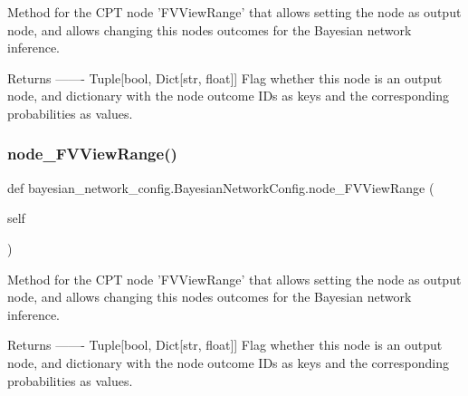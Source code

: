 \begin{DoxyVerb}Method for the CPT node 'FVViewRange' that allows setting the node as output node,
and allows changing this nodes outcomes for the Bayesian network inference.

Returns
-------
Tuple[bool, Dict[str, float]]
    Flag whether this node is an output node, and dictionary with the node outcome IDs as keys
    and the corresponding probabilities as values.
\end{DoxyVerb}
 \mbox{\label{classbayesian__network__config_1_1_bayesian_network_config_a14bac441795a8f3c96df9342dff6ecc2}} 
\subsubsection{\texorpdfstring{node\+\_\+\+F\+V\+View\+Range()}{node\_FVViewRange()}\hspace{0.1cm}{\footnotesize\ttfamily [2/3]}}
{\footnotesize\ttfamily def bayesian\+\_\+network\+\_\+config.\+Bayesian\+Network\+Config.\+node\+\_\+\+F\+V\+View\+Range (\begin{DoxyParamCaption}\item[{}]{self }\end{DoxyParamCaption})}

\begin{DoxyVerb}Method for the CPT node 'FVViewRange' that allows setting the node as output node,
and allows changing this nodes outcomes for the Bayesian network inference.

Returns
-------
Tuple[bool, Dict[str, float]]
    Flag whether this node is an output node, and dictionary with the node outcome IDs as keys
    and the corresponding probabilities as values.
\end{DoxyVerb}
 \mbox{\label{classbayesian__network__config_1_1_bayesian_network_config_a14bac441795a8f3c96df9342dff6ecc2}} 
